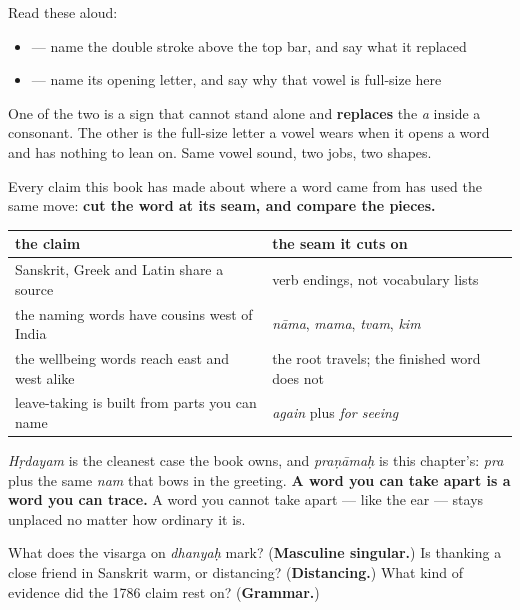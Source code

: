 Read these aloud:

\begin{itemize}
\raggedright
  \item \textbf{} — name the double stroke above the top bar, and say what it replaced
  \item \textbf{} — name its opening letter, and say why that vowel is full-size here
\end{itemize}

One of the two is a sign that cannot stand alone and \textbf{replaces} the \emph{a} inside a consonant. The other is the full-size letter a vowel wears when it opens a word and has nothing to lean on. Same vowel sound, two jobs, two shapes.

\begin{culture}
Every claim this book has made about where a word came from has used the same move: \textbf{cut the word at its seam, and compare the pieces.}

\noindent
\begin{tabularx}{\linewidth}{@{}>{\raggedright\arraybackslash}X>{\raggedright\arraybackslash}X@{}}
\toprule
\textbf{the claim} & \textbf{the seam it cuts on} \\
\midrule
Sanskrit, Greek and Latin share a source & verb endings, not vocabulary lists \\
the naming words have cousins west of India & \emph{nāma}, \emph{mama}, \emph{tvam}, \emph{kim} \\
the wellbeing words reach east and west alike & the root travels; the finished word does not \\
leave-taking is built from parts you can name & \emph{again} plus \emph{for seeing} \\
\bottomrule
\end{tabularx}

\emph{Hṛdayam} is the cleanest case the book owns, and \emph{praṇāmaḥ} is this chapter's: \emph{pra} plus the same \emph{nam} that bows in the greeting. \textbf{A word you can take apart is a word you can trace.} A word you cannot take apart — like the ear — stays unplaced no matter how ordinary it is.
\end{culture}

\begin{tcolorbox}[breakable,colback=teal!4,colframe=teal!35!black,title={Before you move on}]
What does the visarga on \emph{dhanyaḥ} mark? (\textbf{Masculine singular.}) Is thanking a close friend in Sanskrit warm, or distancing? (\textbf{Distancing.}) What kind of evidence did the 1786 claim rest on? (\textbf{Grammar.})
\end{tcolorbox}

